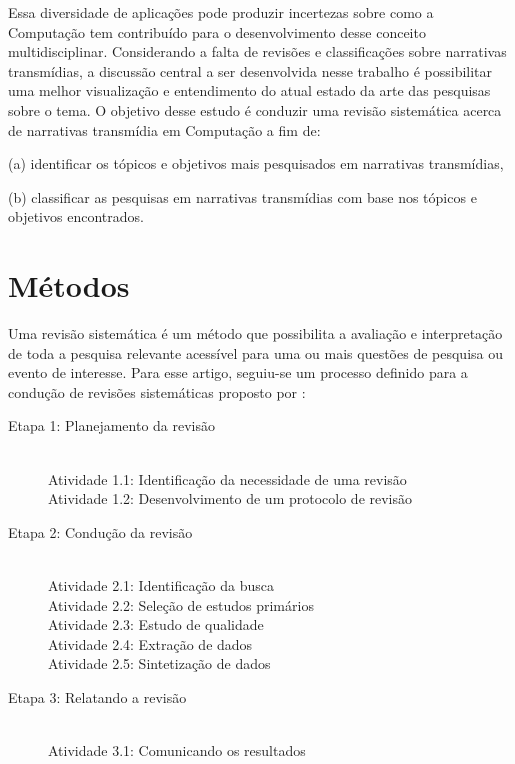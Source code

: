 \documentclass[
article,			%
11pt,				%
oneside,			%
a4paper,			%
english,			%
brazil,				%
sumario=tradicional
]{abntex2}
\begin{document}
  Essa diversidade de aplicações pode produzir incertezas sobre como a Computação tem contribuído para o desenvolvimento desse conceito multidisciplinar. Considerando a falta de revisões e classificações sobre narrativas transmídias, a discussão central a ser desenvolvida nesse trabalho é possibilitar uma melhor visualização e entendimento do atual estado da arte das pesquisas sobre o tema.  O objetivo desse estudo é conduzir uma revisão sistemática acerca de narrativas transmídia em Computação a fim de:

  (a) identificar os tópicos e objetivos mais pesquisados em narrativas transmídias,

  (b) classificar as pesquisas em narrativas transmídias com base nos tópicos e objetivos encontrados.

  \section{Métodos}


  Uma revisão sistemática é um método que possibilita a avaliação e interpretação de toda a pesquisa relevante acessível para uma ou mais questões de pesquisa ou evento de interesse. Para esse artigo, seguiu-se um processo definido para a condução de revisões sistemáticas proposto por :

  \begin{description}
    \item[Etapa 1: Planejamento da revisão] \hfill \\
    Atividade 1.1: Identificação da necessidade de uma revisão \\
    Atividade 1.2: Desenvolvimento de um protocolo de revisão
    \item[Etapa 2: Condução da revisão] \hfill \\
    Atividade 2.1: Identificação da busca \\
    Atividade 2.2: Seleção de estudos primários \\
    Atividade 2.3: Estudo de qualidade \\
    Atividade 2.4: Extração de dados \\
    Atividade 2.5: Sintetização de dados
    \item[Etapa 3: Relatando a revisão] \hfill \\
    Atividade 3.1: Comunicando os resultados
  \end{description}
\end{document}
